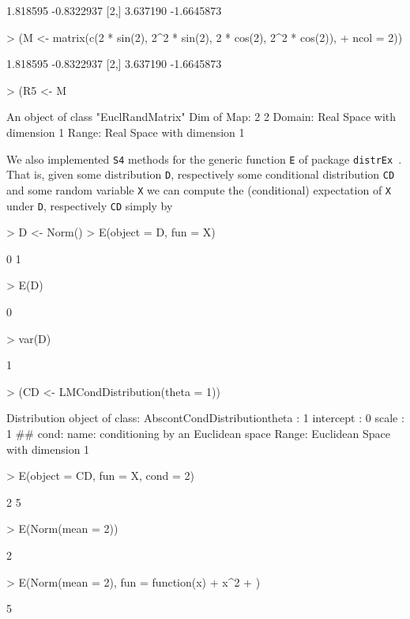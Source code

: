 \documentclass[11pt]{article}
\begin{document}
\begin{Schunk}
\begin{Soutput}
         [,1]       [,2]
[1,] 1.818595 -0.8322937
[2,] 3.637190 -1.6645873
\end{Soutput}
\begin{Sinput}
> (M <- matrix(c(2 * sin(2), 2^2 * sin(2), 2 * cos(2), 2^2 * cos(2)), 
+     ncol = 2))
\end{Sinput}
\begin{Soutput}
         [,1]       [,2]
[1,] 1.818595 -0.8322937
[2,] 3.637190 -1.6645873
\end{Soutput}
\begin{Sinput}
> (R5 <- M %
\end{Sinput}
\begin{Soutput}
An object of class "EuclRandMatrix" 
Dim of Map:	 2 2 
Domain:	Real Space with dimension 1 
Range:	Real Space with dimension 1 
\end{Soutput}
\end{Schunk}
We also implemented {\tt S4} methods for the generic function {\tt E} of 
package {\tt distrEx}~\cite{distr}. That is, given some distribution {\tt D}, 
respectively some conditional distribution {\tt CD} and some random variable {\tt X}
we can compute the (conditional) expectation of {\tt X} under {\tt D}, respectively 
{\tt CD} simply by
\begin{Schunk}
\begin{Sinput}
> D <- Norm()
> E(object = D, fun = X)
\end{Sinput}
\begin{Soutput}
[1] 0 1
\end{Soutput}
\begin{Sinput}
> E(D)
\end{Sinput}
\begin{Soutput}
[1] 0
\end{Soutput}
\begin{Sinput}
> var(D)
\end{Sinput}
\begin{Soutput}
[1] 1
\end{Soutput}
\begin{Sinput}
> (CD <- LMCondDistribution(theta = 1))
\end{Sinput}
\begin{Soutput}
Distribution object of class: AbscontCondDistributiontheta :  1 
intercept :  0 
scale :  1 
## cond:
name:	conditioning by an Euclidean space
Range:	Euclidean Space with dimension 1
\end{Soutput}
\begin{Sinput}
> E(object = CD, fun = X, cond = 2)
\end{Sinput}
\begin{Soutput}
[1] 2 5
\end{Soutput}
\begin{Sinput}
> E(Norm(mean = 2))
\end{Sinput}
\begin{Soutput}
[1] 2
\end{Soutput}
\begin{Sinput}
> E(Norm(mean = 2), fun = function(x) {
+     x^2
+ })
\end{Sinput}
\begin{Soutput}
[1] 5
\end{Soutput}
\end{Schunk}
\end{document}
